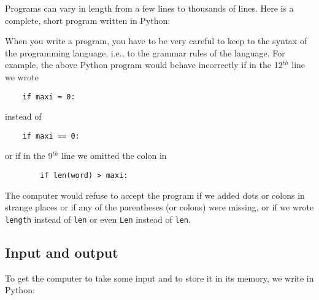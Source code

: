 

Programs can vary in length from a few lines to thousands of lines.
Here is a complete, short program written in Python:





When you write a program, you have to be very careful to keep to the
syntax of the programming language, i.e., to the grammar rules of the language.
For example, the above Python program would
behave incorrectly if in the 12$^{th}$ line we wrote

\begin{Verbatim}
    if maxi = 0:
\end{Verbatim}

instead of 

\begin{Verbatim}
    if maxi == 0:
\end{Verbatim}

or if in the 9$^{th}$ line we omitted the colon in

\begin{Verbatim}
        if len(word) > maxi:
\end{Verbatim}

The computer would refuse to accept the program if we added dots or colons
in strange places
or if any of the parentheses (or colons) were missing, or if we wrote
\verb!length! instead of \verb!len! or even \verb!Len! instead of \verb!len!.

% 


\subsection{Input and output}


To get the computer to take some input  and to store it
in its memory, we write in Python:

